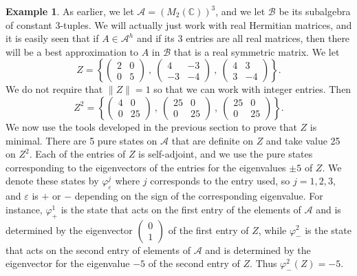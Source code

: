 \documentclass[12pt]{amsart}
\newcommand{\<}{\langle}
\renewcommand{\>}{\rangle}
\newcommand{\e}{\varepsilon}
\newcommand{\var}{\varphi}
\newcommand{\cA}{{\mathcal A}}
\newcommand{\cB}{{\mathcal B}}
\newcommand{\cAH}{{\mathcal A}^h}
\newcommand{\bC}{{\mathbb C}}
\theoremstyle{definition}   %
\newtheorem{example}[theorem]{Example}
\begin{document}
\begin{example}
\label{badnear}
As earlier, we let $\cA = (M_2(\bC))^3$, and we let $\cB$ be its subalgebra
of constant 3-tuples. We will actually just work with real Hermitian matrices, 
and it is easily seen that if $A \in \cAH$ and if its 3 entries are all real matrices,
then there will be a best approximation to $A$ in $\cB$ that is a real 
symmetric matrix.
We let
\[
Z = \left\{ \begin{pmatrix}  2 & 0 \\
                                          0 & 5       \end{pmatrix}     \ , \ 
               \begin{pmatrix}  4 & -3  \\
                                         -3 & -4             \end{pmatrix}     \ , \
              \begin{pmatrix}   4 & 3  \\                                              
                                         3 & -4             \end{pmatrix}     
     \right\}  .         
\]     
We do not require that $\|Z\| = 1$ so that we can work with integer entries. Then
\[
Z^2 = \left\{ \begin{pmatrix}  4 & 0 \\
                                          0 & 25       \end{pmatrix}     \ , \ 
               \begin{pmatrix}  25 & 0  \\
                                         0 & 25             \end{pmatrix}     \ , \
              \begin{pmatrix}   25 & 0  \\                                              
                                         0 & 25             \end{pmatrix}     
     \right\}  .         
\]     
We now use the tools developed in the previous section to prove that $Z$
is minimal. There are 5 pure states on $\cA$ that are definite on $Z$
and take value 25 on $Z^2$. Each of the entries of $Z$ is self-adjoint, 
and we use the pure states corresponding to the eigenvectors of the
entries for the eigenvalues $\pm 5$ of $Z$. We denote these states by $\var^j_\e$
where $j$ corresponds to the entry used, so $j = 1, 2, 3$, and $\e$ 
is $+$ or $-$ depending on the sign of the corresponding eigenvalue. 
For instance, $\var^1_+$ is the state that acts on the first entry of the elements
of $\cA$ and is determined by the eigenvector 
$(\begin{smallmatrix}  0  \\  1  \end{smallmatrix} )$
of the first entry of $Z$, while
$\var^2_-$ is the state that acts on the second entry of elements of $\cA$
and is determined by the eigenvector for the eigenvalue $-5$ of the
second entry of $Z$. Thus $\var^2_-(Z) = -5$. 


\end{example}
\end{document}
